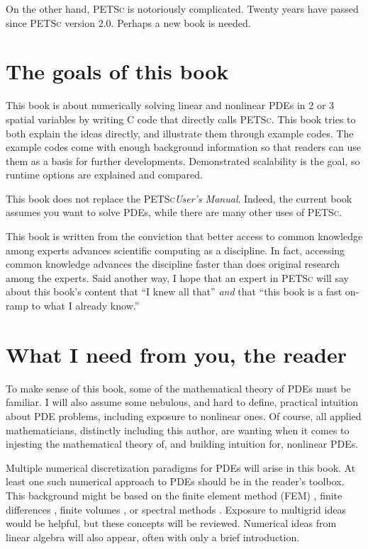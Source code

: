 \documentclass{tufte-book}
\theoremstyle{definition}
\newcommand{\PETSc}{\textsc{PETSc}\xspace}
\begin{document}
On the other hand, \PETSc is notoriously complicated.  Twenty years have passed since \PETSc version 2.0.  Perhaps a new book is needed.

\section{The goals of this book}

This book is about numerically solving linear and nonlinear PDEs in 2 or 3 spatial variables by writing C code that directly calls \PETSc.  This book tries to both explain the ideas directly, and illustrate them through example codes.  The example codes come with enough background information so that readers can use them as a basis for further developments.  Demonstrated scalability is the goal, so runtime options are explained and compared.

This book does not replace the \PETSc \emph{User's Manual}.  Indeed, the current book assumes you want to solve PDEs, while there are many other uses of \PETSc.

This book is written from the conviction that better access to common knowledge among experts advances scientific computing as a discipline.  In fact, accessing common knowledge advances the discipline faster than does original research among the experts.  Said another way, I hope that an expert in \PETSc will say about this book's content that ``I knew all that'' \emph{and} that ``this book is a fast on-ramp to what I already know.''

\section{What I need from you, the reader}

To make sense of this book, some of the mathematical theory of PDEs must be familiar.  I will also assume some nebulous, and hard to define, practical intuition about PDE problems, including exposure to nonlinear ones.  Of course, all applied mathematicians, distinctly including this author, are wanting when it comes to injesting the mathematical theory of, and building intuition for, nonlinear PDEs.

Multiple numerical discretization paradigms for PDEs will arise in this book.  At least one such numerical approach to PDEs should be in the reader's toolbox.  This background might be based on the finite element method (FEM) \citep{Braess,Elmanetal2005}, finite differences \citep{MortonMayers}, finite volumes \citep{LeVeque}, or spectral methods \citep{KarniadakisSherwin,Trefethen}.  Exposure to multigrid ideas \citep{Briggsetal2000} would be helpful, but these concepts will be reviewed.  Numerical ideas from linear algebra \citep{Greenbaum1997,TrefethenBau} will also appear, often with only a brief introduction.
\end{document}
